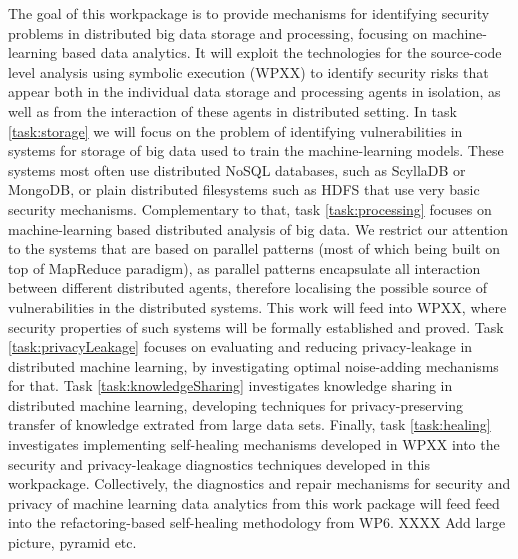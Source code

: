 \begin{Workpackage}{\thewpno}
\begin{WPDescription}
  The goal of this workpackage is to provide mechanisms for identifying security problems in distributed big data storage and processing, focusing on machine-learning based data analytics. It will exploit the technologies for the source-code level analysis using symbolic execution (WPXX) to identify security risks that appear both in the individual data storage and processing agents in isolation, as well as from the interaction of these agents in distributed setting. In task \ref{task:storage} we will focus on the problem of identifying vulnerabilities in systems for storage of big data used to train the machine-learning models. These systems most often use distributed NoSQL databases, such as ScyllaDB or MongoDB, or plain distributed filesystems such as HDFS that use very basic security mechanisms. Complementary to that, task \ref{task:processing} focuses on machine-learning based distributed analysis of big data. We restrict our attention to the systems that are based on parallel patterns (most of which being built on top of MapReduce paradigm), as parallel patterns encapsulate all interaction between different distributed agents, therefore localising the possible source of vulnerabilities in the distributed systems. This work will feed into WPXX, where security properties of such systems will be formally established and proved. Task \ref{task:privacyLeakage} focuses on evaluating and reducing privacy-leakage in distributed machine learning, by investigating optimal noise-adding mechanisms for that. Task \ref{task:knowledgeSharing} investigates knowledge sharing in distributed machine learning, developing techniques for privacy-preserving transfer of knowledge extrated from large data sets. Finally, task \ref{task:healing} investigates implementing self-healing mechanisms developed in WPXX into the security and privacy-leakage diagnostics techniques developed in this workpackage. Collectively, the diagnostics and repair mechanisms for security and privacy of machine learning data analytics from this work package will feed feed into the refactoring-based self-healing methodology from WP6.   XXXX   Add large picture, pyramid etc. 
\end{WPDescription}

\begin{Task}


\end{Task}
\end{Workpackage}
